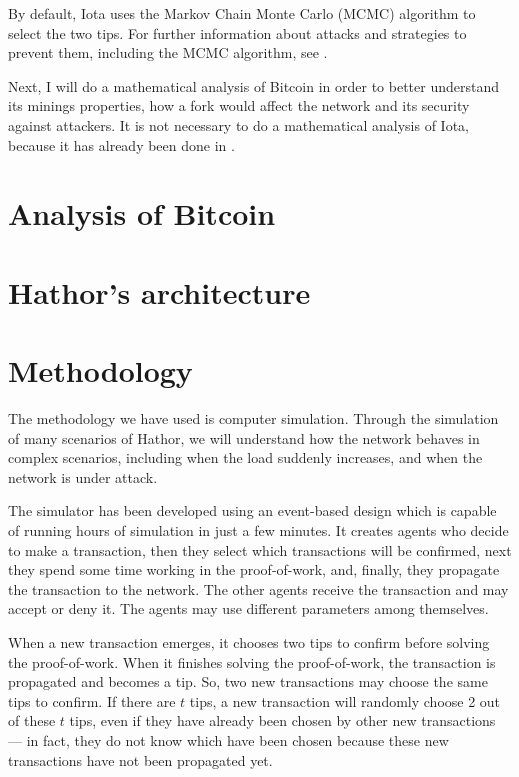 By default, Iota uses the Markov Chain Monte Carlo (MCMC) algorithm to select the two tips. For further information about attacks and strategies to prevent them, including the MCMC algorithm, see \cite{tangle2016}.

Next, I will do a mathematical analysis of Bitcoin in order to better understand its minings properties, how a fork would affect the network and its security against attackers. It is not necessary to do a mathematical analysis of Iota, because it has already been done in \citet{tangle2016}.


\chapter{Analysis of Bitcoin}
\label{ch:hathor-bitcoin-math}



\chapter{Hathor's architecture}



\chapter{Methodology}

The methodology we have used is computer simulation. Through the simulation of many scenarios of Hathor, we will understand how the network behaves in complex scenarios, including when the load suddenly increases, and when the network is under attack.

The simulator has been developed using an event-based design which is capable of running hours of simulation in just a few minutes. It creates agents who decide to make a transaction, then they select which transactions will be confirmed, next they spend some time working in the proof-of-work, and, finally, they propagate the transaction to the network. The other agents receive the transaction and may accept or deny it. The agents may use different parameters among themselves.

When a new transaction emerges, it chooses two tips to confirm before solving the proof-of-work. When it finishes solving the proof-of-work, the transaction is propagated and becomes a tip. So, two new transactions may choose the same tips to confirm. If there are $t$ tips, a new transaction will randomly choose 2 out of these $t$ tips, even if they have already been chosen by other new transactions --- in fact, they do not know which have been chosen because these new transactions have not been propagated yet.

